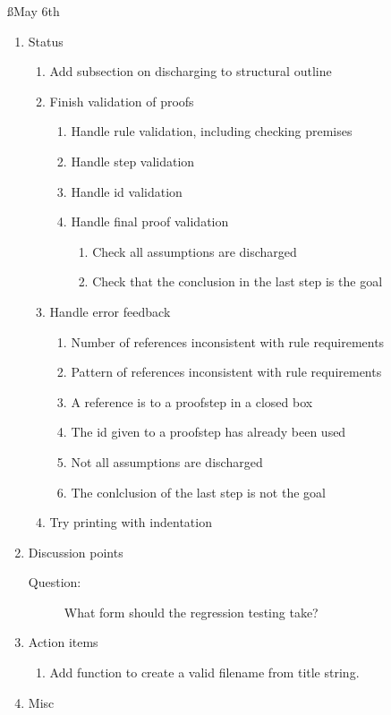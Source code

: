 \documentclass[a4paper]{article}
\begin{document}
\ss{May 6th}
\begin{enumerate}
  \item Status
    \begin{enumerate}[\HollowBox]
      \item[\Checkedbox] Add subsection on discharging to structural outline
      \item Finish validation of proofs
        \begin{enumerate}[\HollowBox]
          \item Handle rule validation, including checking premises
          \item Handle step validation
          \item[\Checkedbox] Handle id validation
          \item[\Checkedbox] Handle final proof validation
            \begin{enumerate}[\HollowBox]
              \item[\Checkedbox] Check all assumptions are discharged
              \item[\Checkedbox] Check that the conclusion in the last step
              is the goal
            \end{enumerate}
        \end{enumerate}
      \item Handle error feedback
        \begin{enumerate}[\HollowBox]
          \item Number of references inconsistent with rule requirements
          \item Pattern of references inconsistent with rule requirements
          \item A reference is to a proofstep in a closed box
          \item[\Checkedbox] The id given to a proofstep has already been 
          used
          \item[\Checkedbox] Not all assumptions are discharged
          \item[\Checkedbox] The conlclusion of the last step is not the goal
        \end{enumerate}
      \item Try printing with indentation
    \end{enumerate}
  \item Discussion points
    \begin{description}
      \item[Question:] What form should the regression testing take?
    \end{description}
  \item Action items
    \begin{enumerate}[\HollowBox]
      \item Add function to create a valid filename from title string.
    \end{enumerate}
  \item Misc
\end{enumerate}
\end{document}
